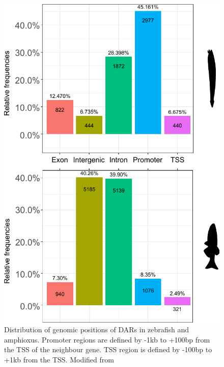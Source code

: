 \begin{figure}[hp!]
\centering
\includegraphics{Figures/Distribution_DARs}
\caption[Genomic distribution of DARs]{ Distribution of genomic positions of DARs in zebrafish and amphioxus. Promoter regions are defined by -1kb to +100bp from the TSS of the neighbour gene. TSS region is defined by -100bp to +1kb from the TSS. Modified from \parencite{gil-galvez_gain_2022}
}
\label{fig:distribution_DARS}
\end{figure} 

